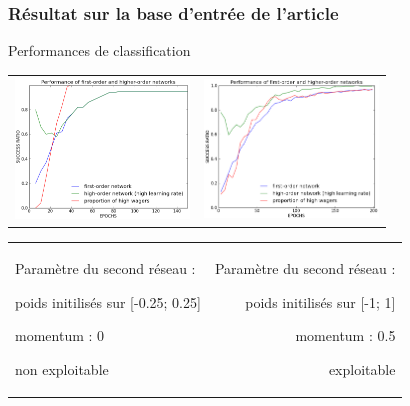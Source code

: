 \documentclass[11pt]{beamer}
\newenvironment{noitemize}
{\begin{list}{}{%
\setlength{\labelwidth}{0em}%
\setlength{\labelsep}{2pt}%
\setlength{\leftmargin}{0pt}%
\renewcommand{\makelabel}{\small\color{cloneBlue}{\textbullet}}}}%
{\end{list}}
\newenvironment{minusitemize}
{\begin{list}{}{%
\setlength{\labelwidth}{0em}%
\setlength{\labelsep}{2pt}%
\setlength{\leftmargin}{-15pt}%
\renewcommand{\makelabel}{\small\color{cloneBlue}{\textbullet}}}}%
{\end{list}}
\begin{document}
\begin{frame}
  \frametitle{Résultat sur la base d'entrée de l'article}
  \begin{center}
  Performances de classification
  \begin{tabular}{cc}
  \hspace*{-1cm}
   \includegraphics[width=175px]{../cleeremans_2007/digital_reco/perf_wag.png}
   &
   \hspace*{-0.3cm}
   \includegraphics[width=175px]{../cleeremans_2007/digital_reco/perf_boost.png}
  \end{tabular}

  \begin{tabular}{lr}
  \begin{minipage}{170px}
    \hspace*{-0.2cm}
    \footnotesize Paramètre du second réseau :
    \footnotesize
      \begin{minusitemize}
      \item poids initilisés sur [-0.25; 0.25]
      \item momentum : 0
      \item non exploitable
      \end{minusitemize}
    \end{minipage}
    &
    \begin{minipage}{170px}
    \hspace*{0.2cm}
    \footnotesize Paramètre du second réseau :
    \footnotesize\begin{noitemize}
     \item poids initilisés sur [-1; 1]
     \item momentum : 0.5
     \item exploitable
    \end{noitemize}
    
    \end{minipage}
  \end{tabular}
  \end{center}
\end{frame}
\end{document}
